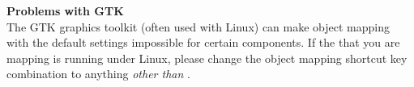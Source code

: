 \textbf{Problems with GTK}\\
The GTK graphics toolkit (often used with Linux) can make object mapping with the default \app{} settings impossible for certain components. If the \gdaut{} that you are mapping is running under Linux, please change the object mapping shortcut key combination to anything \emph{other than} .
